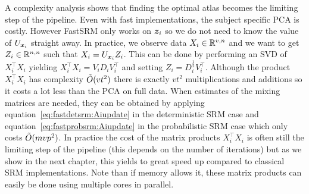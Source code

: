 A complexity analysis shows that finding the optimal atlas becomes the limiting
step of the pipeline. Even with fast implementations, the subject specific PCA
is costly. However FastSRM only works on $\boldsymbol{z}_i$ so we do not need to know the value of $U_{\boldsymbol{x}_i}$ straight away.
In practice, we observe data $X_i \in \mathbb{R}^{v, n}$ and we want to get $Z_i
\in \mathbb{R}^{n, n}$ such that $X_i = U_{\boldsymbol{x}_i} Z_i$. This can be done by performing an
SVD of $X_i^{\top} X_i$ yielding $X_i^{\top}X_i= V_i D_i V_i^{\top}$ and setting $Z_i = D_i^{\frac12} V_i^{\top}$.
Although the product $X_i^{\top} X_i$ has complexity $\tilde{O}(vt^2)$ there is
exactly $vt^2$ multiplications and additions so it costs a lot less than the PCA
on full data. When estimates of the mixing matrices are needed, they can be obtained by
applying equation~\eqref{eq:fastdetsrm:Aiupdate} in the deterministic SRM case and
equation~\eqref{eq:fastprobsrm:Aiupdate} in the probabilistic SRM case which only costs
$\tilde{O}(mvp^2)$.
In practice the cost of the matrix products $X_i^{\top} X_i$ is often still the
limiting step of the pipeline (this depends on the number of iterations) but as
we show in the next chapter, this yields to great speed up compared to classical
SRM implementations. Note than if memory allows it, these matrix products can easily be done using multiple cores in parallel.




